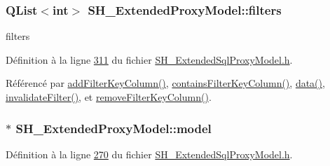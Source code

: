 \hypertarget{classSH__ExtendedProxyModel_a99a5c4c6b9d125c87f048c76d22278d3}{
\subsubsection[{filters}]{\setlength{\rightskip}{0pt plus 5cm}Q\-List$<$int$>$ S\-H\-\_\-\-Extended\-Proxy\-Model\-::filters\hspace{0.3cm}{\ttfamily [private]}}}\label{classSH__ExtendedProxyModel_a99a5c4c6b9d125c87f048c76d22278d3}


filters 



Définition à la ligne \hyperlink{SH__ExtendedSqlProxyModel_8h_source_l00311}{311} du fichier \hyperlink{SH__ExtendedSqlProxyModel_8h_source}{S\-H\-\_\-\-Extended\-Sql\-Proxy\-Model.\-h}.



Référencé par \hyperlink{classSH__ExtendedProxyModel_a7b432fac5c42bf84a005f2942896ca32}{add\-Filter\-Key\-Column()}, \hyperlink{classSH__ExtendedProxyModel_a81c40d3ce9710029cae19cc65bf5419d}{contains\-Filter\-Key\-Column()}, \hyperlink{classSH__ExtendedProxyModel_afbc947efbe1107fc5bf8926c52902a1c}{data()}, \hyperlink{classSH__ExtendedProxyModel_a7cfb1803f839023c7ba6fc67b900d76a}{invalidate\-Filter()}, et \hyperlink{classSH__ExtendedProxyModel_a631c2a56b4a301b9c8a855facec3ac1c}{remove\-Filter\-Key\-Column()}.

\hypertarget{classSH__ExtendedProxyModel_a8c8b8930c6b1abd9bbb1dce1fdc9690b}{
\subsubsection[{model}]{$\ast$ S\-H\-\_\-\-Extended\-Proxy\-Model\-::model\hspace{0.3cm}{\ttfamily [protected]}}}\label{classSH__ExtendedProxyModel_a8c8b8930c6b1abd9bbb1dce1fdc9690b}


Définition à la ligne \hyperlink{SH__ExtendedSqlProxyModel_8h_source_l00270}{270} du fichier \hyperlink{SH__ExtendedSqlProxyModel_8h_source}{S\-H\-\_\-\-Extended\-Sql\-Proxy\-Model.\-h}.



